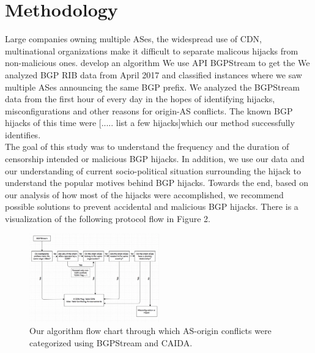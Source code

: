 \section{Methodology}\label{sec:methodology}
Large companies owning multiple ASes, the widespread use of CDN, multinational organizations make it difficult to separate malicous hijacks from non-malicious ones.   develop an algorithm We use API BGPStream to get the 
We analyzed BGP RIB data from April 2017 and classified instances where we saw multiple ASes announcing the same BGP prefix. We analyzed the BGPStream data from the first hour of every day in the hopes of identifying hijacks, misconfigurations and other reasons for origin-AS conflicts. The known BGP hijacks of this time were [..... list a few hijacks]which our method successfully  identifies. \\
The goal of this study was to understand the frequency and the duration of censorship intended or malicious BGP hijacks. In addition, we  use our data and our understanding of current socio-political situation surrounding the hijack to understand the popular motives behind BGP hijacks. Towards the end, based on our analysis of how most of the hijacks were accomplished, we recommend possible solutions to prevent accidental and malicious BGP hijacks. 
There is a visualization of the following protocol flow in Figure 2.

 \begin{figure}[!htbp]
	\includegraphics[width=0.5\textwidth]{flow.png}
	\caption{Our algorithm flow chart through which AS-origin conflicts were categorized using BGPStream and CAIDA.}
	\label{a:label}
\end{figure}

